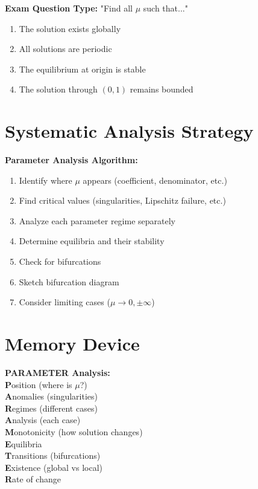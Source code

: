 \documentclass[12pt]{article}
\begin{document}
\begin{mdframed}[backgroundcolor=yellow!10]
\textbf{Exam Question Type:} "Find all $\mu$ such that..."
\begin{enumerate}
    \item The solution exists globally
    \item All solutions are periodic
    \item The equilibrium at origin is stable
    \item The solution through $(0,1)$ remains bounded
\end{enumerate}
\end{mdframed}

\section{Systematic Analysis Strategy}

\begin{keypoint}
\textbf{Parameter Analysis Algorithm:}
\begin{enumerate}
    \item Identify where $\mu$ appears (coefficient, denominator, etc.)
    \item Find critical values (singularities, Lipschitz failure, etc.)
    \item Analyze each parameter regime separately
    \item Determine equilibria and their stability
    \item Check for bifurcations
    \item Sketch bifurcation diagram
    \item Consider limiting cases ($\mu \to 0, \pm\infty$)
\end{enumerate}
\end{keypoint}

\section{Memory Device}

\begin{center}
\textbf{PARAMETER Analysis:}\\
\textbf{P}osition (where is $\mu$?)\\
\textbf{A}nomalies (singularities)\\
\textbf{R}egimes (different cases)\\
\textbf{A}nalysis (each case)\\
\textbf{M}onotonicity (how solution changes)\\
\textbf{E}quilibria\\
\textbf{T}ransitions (bifurcations)\\
\textbf{E}xistence (global vs local)\\
\textbf{R}ate of change
\end{center}
\end{document}
